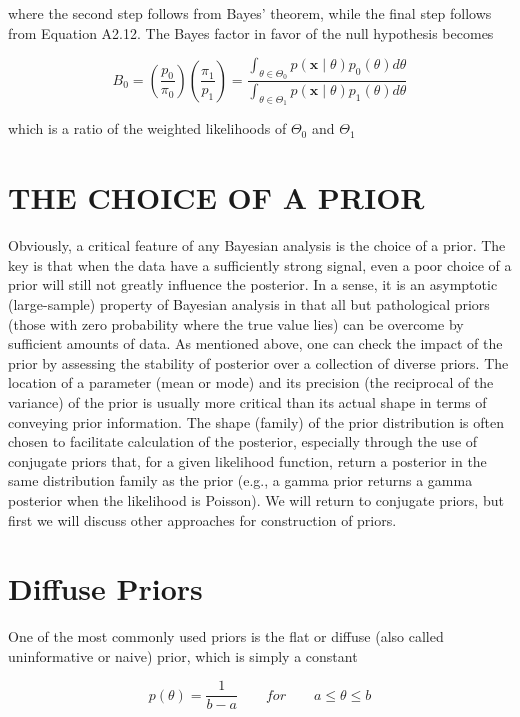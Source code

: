 \documentclass{article}
\begin{document}
where the second step follows from Bayes' theorem, while the final step follows from Equation A2.12. The Bayes factor in favor of the null hypothesis becomes

\begin{equation}
B_{0}=\left(\frac{p_{0}}{\pi_{0}}\right)\left(\frac{\pi_{1}}{p_{1}}\right)=\frac{\int_{\theta\in\Theta_{0}}p(\mathbf{x}\mid\theta)p_{0}(\theta)d\theta}{\int_{\theta\in\Theta_{1}}p(\mathbf{x}\mid\theta)p_{1}(\theta)d\theta}
\end{equation}

which is a ratio of the weighted likelihoods of  $ \Theta_{0} $ and  $ \Theta_{1} $

\section{THE CHOICE OF A PRIOR}
Obviously, a critical feature of any Bayesian analysis is the choice of a prior. The key is that when the data have a sufficiently strong signal, even a poor choice of a prior will still not greatly influence the posterior. In a sense, it is an asymptotic (large-sample) property of Bayesian analysis in that all but pathological priors (those with zero probability where the true value lies) can be overcome by sufficient amounts of data. As mentioned above, one can check the impact of the prior by assessing the stability of posterior over a collection of diverse priors. The location of a parameter (mean or mode) and its precision (the reciprocal of the variance) of the prior is usually more critical than its actual shape in terms of conveying prior information. The shape (family) of the prior distribution is often chosen to facilitate calculation of the posterior, especially through the use of conjugate priors that, for a given likelihood function, return a posterior in the same distribution family as the prior (e.g., a gamma prior returns a gamma posterior when the likelihood is Poisson). We will return to conjugate priors, but first we will discuss other approaches for construction of priors.

\section{Diffuse Priors}
One of the most commonly used priors is the flat or diffuse (also called uninformative or naive) prior, which is simply a constant

\begin{equation}
p(\theta)=\frac{1}{b-a}\qquad for\qquad a\leq\theta\leq b
\end{equation}
\end{document}
